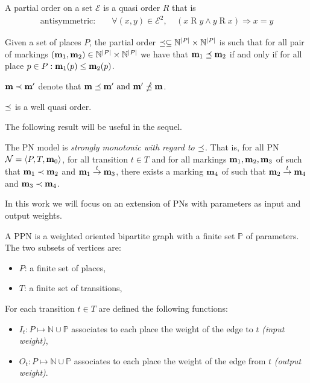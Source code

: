 \begin{defi}
  A partial order on a set $\mathcal{E}$ is a quasi order $R$ that is
  \begin{align*}
    \text{antisymmetric: } &&\forall (x, y) \in \mathcal{E}^2,\ & (x \mathrel{R} y\land y \mathrel{R} x)\Rightarrow x = y
  \end{align*}
\end{defi}

\begin{defi}
  Given a set of places $P$, the partial order \(\preceq \subseteq \mathbb{N}^{|P|} \times \mathbb{N}^{|P|}\) is such that for all pair of markings \((\mathbf{m}_1, \mathbf{m}_2) \in \mathbb{N}^{|P|} \times \mathbb{N}^{|P|}\) we have that \(\mathbf{m}_1 \preceq \mathbf{m}_2\) if and only if for all place \(p \in P : \mathbf{m}_1(p) \leq \mathbf{m}_2(p)\).
\end{defi}

\(\mathbf{m} \prec \mathbf{m'}\) denote that \(\mathbf{m} \preceq \mathbf{m'} \text{ and } \mathbf{m'} \npreceq \mathbf{m}\).

\begin{lemm}
  \label{lemm:wqo}
  $\preceq$ is a well quasi order.
\end{lemm}

The following result will be useful in the sequel.

\begin{lemm}
  The \ac{PN} model is \emph{strongly monotonic with regard to $\preceq$}. That is, for all \ac{PN} $\mathcal{N} = \langle P,T, \mathbf{m}_0\rangle$, for all transition $t \in T$ and for all markings $\mathbf{m}_1, \mathbf{m}_2, \mathbf{m}_3$ of \tupleN such that $\mathbf{m}_1 \prec \mathbf{m}_2$ and $\mathbf{m}_1 \stackrel{t}{\to} \mathbf{m}_3$, there exists a marking $\mathbf{m}_4$ of \tupleN such that $\mathbf{m}_2 \stackrel{t}{\to} \mathbf{m}_4$ and $\mathbf{m}_3 \prec \mathbf{m}_4$. 
\end{lemm}

In this work we will focus on an extension of \acp{PN} with parameters as input and output weights.

\begin{defi}
  A \acf{PPN} \SPTP is a weighted oriented bipartite graph with a finite set $\mathbb{P}$ of parameters. The two subsets of vertices are:
  \begin{itemize}
    \item $P$: a finite set of places,
    \item $T$: a finite set of transitions,
  \end{itemize}
  For each transition $t \in T$ are defined the following functions:
  \begin{itemize}
    \item $I_t : P \mapsto \mathbb{N} \cup \mathbb{P}$ associates to each place the weight of the edge to $t$ \emph{(input weight)},
    \item $O_t : P \mapsto \mathbb{N} \cup \mathbb{P}$ associates to each place the weight of the edge from $t$ \emph{(output weight)}.
  \end{itemize}
\end{defi}

